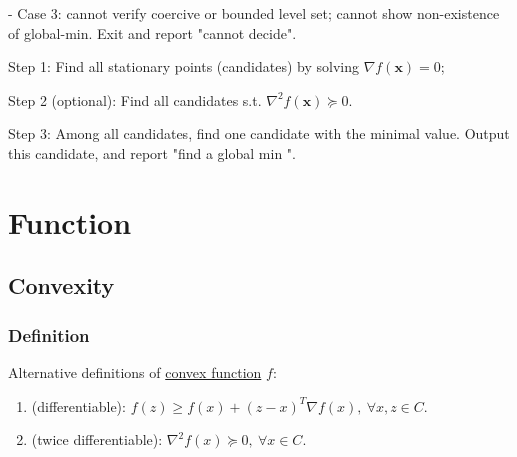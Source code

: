 \documentclass[11pt,a4paper]{article}
\begin{document}
- Case 3: cannot verify coercive or bounded level set; cannot show non-existence of global-min. Exit and report "cannot decide".

Step 1: Find all stationary points (candidates) by solving $\nabla f(\mathbf{x})=0$;

Step 2 (optional): Find all candidates s.t. $\nabla^{2} f(\mathbf{x}) \succeq 0$.

Step 3: Among all candidates, find one candidate with the minimal value. Output this candidate, and report "find a global $\mathrm{min}$ ".






\section{Function}
\subsection{Convexity}
\subsubsection{Definition}
\begin{center}
\end{center}

Alternative definitions of \underline{convex function} $f$:
\begin{enumerate}[(1)]
    \item (differentiable): $f(z) \geq f(x)+(z-x)^{T} \nabla f(x), \ \forall x, z \in C .$
    \item (twice differentiable): $\nabla^{2} f(x) \succeq 0,\ \forall x \in C .$
\end{enumerate}
\end{document}
